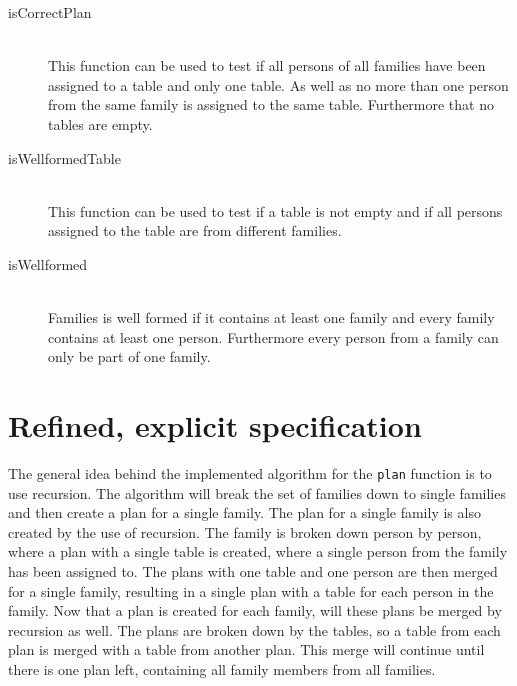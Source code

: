 \documentclass[a4]{article}
\begin{document}
\begin{description}
  \item[isCorrectPlan] \hfill \\ This function can be used to test if all persons of all families have been assigned to a table and only one table. As well as no more than one person from the same family is assigned to the same table. Furthermore that no tables are empty.
  \item[isWellformedTable] \hfill \\ This function can be used to test if a table is not empty and if all persons assigned to the table are from different families.
  \item[isWellformed] \hfill \\ Families is well formed if it contains at least one family and every family contains at least one person. Furthermore every person from a family can only be part of one family.
\end{description}

\section{Refined, explicit specification}

  

The general idea behind the implemented algorithm for the \verb=plan= function is to use recursion. The algorithm will break the set of families down to single families and then create a plan for a single family. The plan for a single family is also created by the use of recursion. The family is broken down person by person, where a plan with a single table is created, where a single person from the family has been assigned to. The plans with one table and one person are then merged for a single family, resulting in a single plan with a table for each person in the family. Now that a plan is created for each family, will these plans be merged by recursion as well. The plans are broken down by the tables, so a table from each plan is merged with a table from another plan. This merge will continue until there is one plan left, containing all family members from all families.
\end{document}
